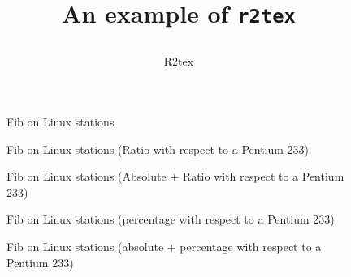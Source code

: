 \documentclass[11pt]{article}
\begin{document}
\title{An example of \texttt{r2tex}
\author{R2tex}}
\maketitle

\begin{figure}[h]
\begin{center}
\begin{small}

\end{small}
\end{center}
\caption{Fib on Linux stations}
\end{figure}

\begin{figure}[h]
\begin{center}
\begin{small}

\end{small}
\end{center}
\caption{Fib on Linux stations (Ratio with respect to a Pentium 233)}
\end{figure}

\begin{figure}[h]
\begin{center}
\begin{small}

\end{small}
\end{center}
\caption{Fib on Linux stations (Absolute + Ratio with respect to a Pentium 233)}
\end{figure}

\begin{figure}[h]
\begin{center}
\begin{small}

\end{small}
\end{center}
\caption{Fib on Linux stations (percentage with respect to a Pentium 233)}
\end{figure}

\begin{figure}[h]
\begin{center}
\begin{small}

\end{small}
\end{center}
\caption{Fib on Linux stations (absolute + percentage with respect to a Pentium 233)}
\end{figure}
\end{document}
